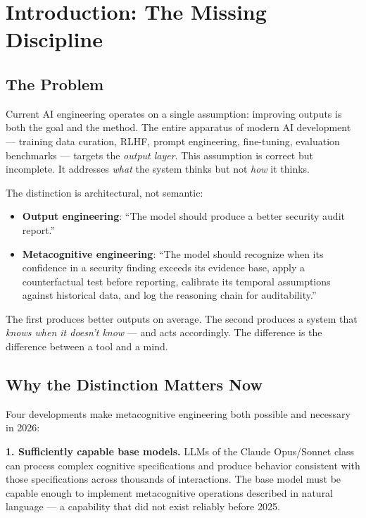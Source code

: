 \documentclass[12pt,a4paper]{article}
\theoremstyle{plain}
\theoremstyle{definition}
\theoremstyle{remark}
\begin{document}
\tableofcontents
\newpage

\section{Introduction: The Missing Discipline}

\subsection{The Problem}

Current AI engineering operates on a single assumption: improving outputs is both the goal and the method. The entire apparatus of modern AI development --- training data curation, RLHF, prompt engineering, fine-tuning, evaluation benchmarks --- targets the \emph{output layer}. This assumption is correct but incomplete. It addresses \emph{what} the system thinks but not \emph{how} it thinks.

The distinction is architectural, not semantic:

\begin{itemize}[nosep]
\item \textbf{Output engineering}: ``The model should produce a better security audit report.''
\item \textbf{Metacognitive engineering}: ``The model should recognize when its confidence in a security finding exceeds its evidence base, apply a counterfactual test before reporting, calibrate its temporal assumptions against historical data, and log the reasoning chain for auditability.''
\end{itemize}

The first produces better outputs on average. The second produces a system that \emph{knows when it doesn't know} --- and acts accordingly. The difference is the difference between a tool and a mind.

\subsection{Why the Distinction Matters Now}

Four developments make metacognitive engineering both possible and necessary in 2026:

\textbf{1. Sufficiently capable base models.} LLMs of the Claude Opus/Sonnet class can process complex cognitive specifications and produce behavior consistent with those specifications across thousands of interactions. The base model must be capable enough to implement metacognitive operations described in natural language --- a capability that did not exist reliably before 2025.
\end{document}

